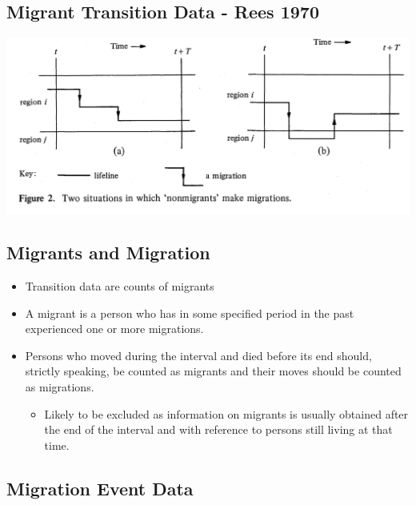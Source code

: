 \documentclass[
]{book}
\providecommand{\tightlist}{%
  \setlength{\itemsep}{0pt}\setlength{\parskip}{0pt}}
\begin{document}
\hypertarget{migrant-transition-data---rees-1970}{%
\subsection{Migrant Transition Data - Rees 1970}\label{migrant-transition-data---rees-1970}}

\includegraphics[width=1\linewidth]{img/rees-1977-non-migration}

\hypertarget{migrants-and-migration}{%
\subsection{Migrants and Migration}\label{migrants-and-migration}}

\begin{itemize}
\tightlist
\item
  Transition data are counts of migrants
\item
  A migrant is a person who has in some specified period in the past experienced one or more migrations.
\item
  Persons who moved during the interval and died before its end should, strictly speaking, be counted as migrants and their moves should be counted as migrations.

  \begin{itemize}
  \tightlist
  \item
    Likely to be excluded as information on migrants is usually obtained after the end of the interval and with reference to persons still living at that time.
  \end{itemize}
\end{itemize}

\hypertarget{migration-event-data}{%
\subsection{Migration Event Data}\label{migration-event-data}}
\end{document}
